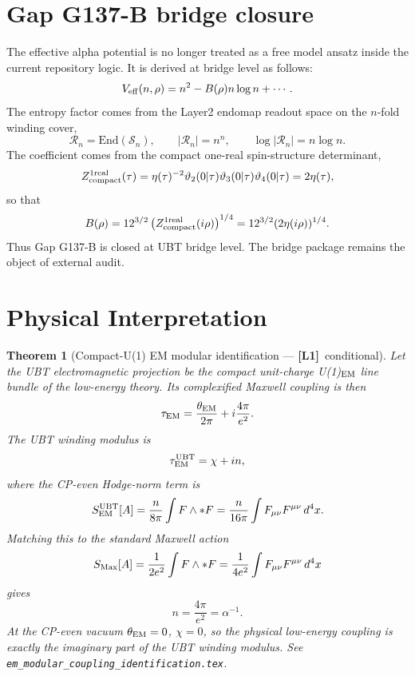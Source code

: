 \documentclass[12pt,a4paper]{article}
\newtheorem{theorem}{Theorem}[section]
\theoremstyle{definition}\newtheorem{definition}[theorem]{Definition}
\theoremstyle{remark}\newtheorem{remark}[theorem]{Remark}
\newcommand{\Lo}{\textbf{[L1]}}
\begin{document}
\section{Gap G137-B bridge closure}
\label{sec:g137b_closure}

The effective alpha potential is no longer treated as a free model ansatz inside
the current repository logic.  It is derived at bridge level as follows:
\[
  V_{\rm eff}(n,\rho)=n^2-B(\rho)n\log n+\cdots.
\]
The entropy factor comes from the Layer2 endomap readout space on the $n$-fold
winding cover,
\[
  \mathcal R_n=\mathrm{End}(\mathcal S_n),
  \qquad
  |\mathcal R_n|=n^n,
  \qquad
  \log|\mathcal R_n|=n\log n.
\]
The coefficient comes from the compact one-real spin-structure determinant,
\[
  Z_{\rm compact}^{1\rm real}(\tau)
  =\eta(\tau)^{-2}\vartheta_2(0|\tau)\vartheta_3(0|\tau)\vartheta_4(0|\tau)
  =2\eta(\tau),
\]
so that
\[
  B(\rho)=12^{3/2}\left(Z_{\rm compact}^{1\rm real}(i\rho)\right)^{1/4}
  =12^{3/2}(2\eta(i\rho))^{1/4}.
\]
Thus Gap G137-B is closed at UBT bridge level.  The bridge package remains the
object of external audit.

\section{Physical Interpretation}
\label{sec:interp}

\begin{theorem}[Compact-U(1) EM modular identification --- \Lo\ conditional]
\label{thm:nalpha}
Let the UBT electromagnetic projection be the compact unit-charge
U(1)$_{\rm EM}$ line bundle of the low-energy theory.  Its complexified
Maxwell coupling is then
\[
  \tau_{\rm EM}=\frac{\theta_{\rm EM}}{2\pi}+i\frac{4\pi}{e^2}.
\]
The UBT winding modulus is
\[
  \tau^{\rm UBT}_{\rm EM}=\chi+i n,
\]
where the CP-even Hodge-norm term is
\[
  S^{\rm UBT}_{\rm EM}[A]
  =\frac{n}{8\pi}\int F\wedge *F
  =\frac{n}{16\pi}\int F_{\mu\nu}F^{\mu\nu}\,d^4x.
\]
Matching this to the standard Maxwell action
\[
  S_{\rm Max}[A]=\frac{1}{2e^2}\int F\wedge *F
  =\frac{1}{4e^2}\int F_{\mu\nu}F^{\mu\nu}\,d^4x
\]
gives
\[
  n=\frac{4\pi}{e^2}=\alpha^{-1}.
\]
At the CP-even vacuum \(\theta_{\rm EM}=0\), \(\chi=0\), so the physical
low-energy coupling is exactly the imaginary part of the UBT winding modulus.
See \texttt{em\_modular\_coupling\_identification.tex}.
\end{theorem}
\end{document}
